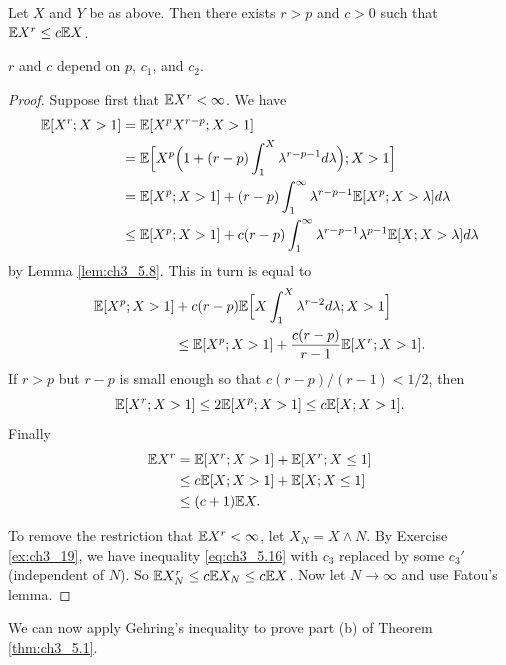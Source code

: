 
\begin{theorem}[Gehring]\label{thm:ch3_5.9}
Let $X$ and $Y$ be as above. Then there exists $r > \allowbreak p$ and $c > 0$ such that $\mathbb{E} X^r \leq c\mathbb{E} X$.
\end{theorem}

$r$ and $c$ depend on $p$, $c_1$, and $c_2$.

\begin{proof}
Suppose first that $\mathbb{E} X^r < \infty$. We have
\begin{align*}
    \mathbb{E}[X^r; X > 1] &= \mathbb{E}[X^pX^{r-p}; X > 1] \\
    &= \mathbb{E}\Big[X^p\Big(1 + (r-p)\int_1^X \lambda^{r-p-1}d\lambda\Big); X > 1\Big] \\
    &= \mathbb{E}[X^p; X > 1] + (r-p)\int_1^\infty \lambda^{r-p-1}\mathbb{E}[X^p; X > \lambda]d\lambda \\
    &\leq \mathbb{E}[X^p; X > 1] + c(r-p)\int_1^\infty \lambda^{r-p-1}\lambda^{p-1}\mathbb{E}[X; X > \lambda]d\lambda
\end{align*}
by Lemma \ref{lem:ch3_5.8}. This in turn is equal to
\begin{align*}
    \mathbb{E}[X^p; X > 1] &+ c(r-p)\mathbb{E}\Big[X\int_1^X \lambda^{r-2}d\lambda; X > 1\Big] \\
    &\leq \mathbb{E}[X^p; X > 1] + \frac{c(r-p)}{r-1}\mathbb{E}[X^r; X > 1].
\end{align*}
If $r > p$ but $r-p$ is small enough so that $c(r-p)/(r-1) < 1/2$, then
\[
    \mathbb{E}[X^r; X > 1] \leq 2\mathbb{E}[X^p; X > 1] \leq c\mathbb{E}[X; X > 1].
\]
Finally
\begin{align*}
    \mathbb{E} X^r &= \mathbb{E}[X^r; X > 1] + \mathbb{E}[X^r; X \leq 1] \\
    &\leq c\mathbb{E}[X; X > 1] + \mathbb{E}[X; X \leq 1] \\
    &\leq (c + 1)\mathbb{E} X.
\end{align*}

To remove the restriction that $\mathbb{E} X^r < \infty$, let $X_N = X \wedge N$. By Exercise \ref{ex:ch3_19}, we have inequality \eqref{eq:ch3_5.16} with $c_3$ replaced by some $c_3'$ (independent of $N$). So $\mathbb{E} X_N^r \leq c\mathbb{E} X_N \leq c\mathbb{E} X$. Now let $N \to \infty$ and use Fatou's lemma.
\end{proof}


We can now apply Gehring's inequality to prove part (b) of Theorem \ref{thm:ch3_5.1}.

